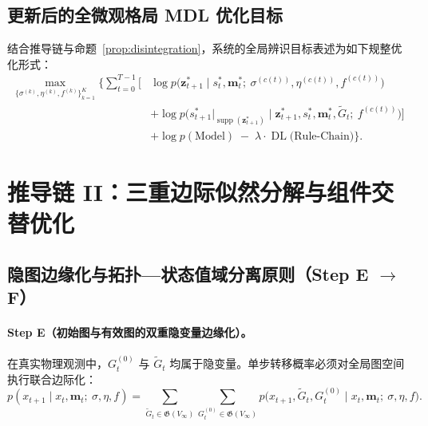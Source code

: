 \documentclass[11pt,a4paper]{article}
\numberwithin{equation}{section}
\theoremstyle{definition}
\theoremstyle{remark}
\DeclareMathOperator{\supp}{\mathrm{supp}} %
\DeclareMathOperator{\DL}{\mathrm{DL}}     %
\begin{document}
	\subsection{更新后的全微观格局 MDL 优化目标}
	
	结合推导链与命题~\ref{prop:disintegration}，系统的全局辨识目标表述为如下规整优化形式：
	\begin{equation}
		\begin{aligned}
			\max_{\{\sigma^{(k)}, \eta^{(k)}, f^{(k)}\}_{k=1}^K} \Bigg\{
			\sum_{t=0}^{T-1} \bigg[
			& \log p\bigl(\mathbf{z}_{t+1}^\ast\mid s_t^\ast, \mathbf{m}_t^\ast;\ \sigma^{(c(t))}, \eta^{(c(t))}, f^{(c(t))}\bigr) \\
			& + \log p\bigl(s_{t+1}^\ast|_{\supp(\mathbf{z}_{t+1}^\ast)}\mid \mathbf{z}_{t+1}^\ast, s_t^\ast, \mathbf{m}_t^\ast, \widetilde{G}_t;\ f^{(c(t))}\bigr) \bigg] \\
			& + \log p(\text{Model}) \;-\; \lambda \cdot \DL\bigl(\text{Rule-Chain}\bigr) \Bigg\}.
		\end{aligned}
		\label{eq:mdl-chain}
	\end{equation}
	
	\section{\texorpdfstring{推导链 II：三重边际似然分解与组件交替优化}{推导链 II：三重边际似然分解与组件交替优化}}\label{sec:dual-learning}
	
	\subsection{\texorpdfstring{隐图边缘化与拓扑—状态值域分离原则（Step E $\to$ F）}{隐图边缘化与拓扑—状态值域分离原则（Step E -> F）}}
	
	\paragraph{Step E（初始图与有效图的双重隐变量边缘化）。}
	在真实物理观测中，$G_t^{(0)}$ 与 $\widetilde{G}_t$ 均属于隐变量。单步转移概率必须对全局图空间执行联合边际化：
	\begin{equation}
		p(x_{t+1}\mid x_t, \mathbf{m}_t;\ \sigma, \eta, f) = \sum_{\widetilde{G}_t\in\mathfrak{G}(V_\infty)} \sum_{G_t^{(0)}\in\mathfrak{G}(V_\infty)} p\bigl(x_{t+1}, \widetilde{G}_t, G_t^{(0)}\mid x_t, \mathbf{m}_t;\ \sigma, \eta, f\bigr).
		\label{eq:step-e}
	\end{equation}
	
\end{document}
